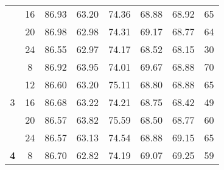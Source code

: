 \documentclass[10pt,twocolumn,letterpaper]{ieeeconf}
\begin{document}
\begin{table}[h!]
{\begin{tabular}{|c|c|c|c|c|c|c|c|}
                                                                                              & 16                 & 86.93        & 63.20            & 74.36           & 68.88          & 68.92          & 65                                                              \\
                                                                                              & 20                 & 86.98        & 62.98            & 74.31           & 69.17          & 68.77          & 64                                                              \\
                                                                                              & 24                 & 86.55        & 62.97            & 74.17           & 68.52          & 68.15          & 30                                                              \\ \hline
\multirow{5}{*}{3}                                                                            & 8                  & 86.92        & 63.95            & 74.01           & 69.67          & 68.88          & 70                                                              \\
                                                                                              & 12                 & 86.60        & 63.20            & 75.11           & 68.80          & 68.88          & 65                                                              \\
                                                                                              & 16                 & 86.68        & 63.22            & 74.21           & 68.75          & 68.42          & 49                                                              \\
                                                                                              & 20                 & 86.57        & 63.82            & 75.59           & 68.50          & 68.77          & 60                                                              \\
                                                                                              & 24                 & 86.57        & 63.13            & 74.54           & 68.88          & 69.15          & 65                                                              \\ \hline
\multirow{5}{*}{\textbf{4}}                                                                            & 8                  & 86.70        & 62.82            & 74.19           & 69.07          & 69.25          & 59                                                              \\

\end{tabular}}
\end{table}
\end{document}
